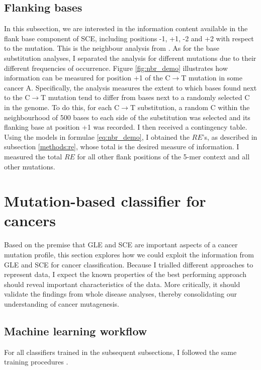 \subsection{Flanking bases}\label{methods:nbr}
In this subsection, we are interested in the information content available in the flank base component of SCE, including positions -1, +1, -2 and +2 with respect to the mutation. This is the neighbour analysis from \citet{Zhu2017}. As for the base substitution analyses, I separated the analysis for different mutations due to their different frequencies of occurrence. Figure \ref{fig:nbr_demo} illustrates how information can be measured for position +1 of the C$\rightarrow$T mutation in some cancer A. Specifically, the analysis measures the extent to which bases found next to the C$\rightarrow$T mutation tend to differ from bases next to a randomly selected C in the genome. To do this, for each C$\rightarrow$T substitution, a random C within the neighbourhood of 500 bases to each side of the substitution was selected and its flanking base at position +1 was recorded. I then received a contingency table. Using the models in formulae \ref{eq:nbr_demo}, I obtained the $RE$'s, as described in subsection \ref{methods:re}, whose total is the desired measure of information. I measured the total $RE$ for all other flank positions of the 5-mer context and all other mutations.



\section{Mutation-based classifier for cancers}\label{methods:ml}
Based on the premise that GLE and SCE are important aspects of a cancer mutation profile, this section explores how we could exploit the information from GLE and SCE for cancer classification. Because I trialled different approaches to represent data, I expect the known properties of the best performing approach should reveal important characteristics of the data. More critically, it should validate the findings from whole disease analyses, thereby consolidating our understanding of cancer mutagenesis.

\subsection{Machine learning workflow}\label{methods:ml_workflow}
For all classifiers trained in the subsequent subsections, I followed the same training procedures \citep{Zengyou2015DataApplications}. 


